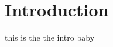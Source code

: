 \def\mytitle{KIIIB}
\def\myauthor{Andreas Møller s042809, David Emil Lemvigh s042809}
\def\affiliation{IMM@DTU}

\section{Introduction}
\label{introduction}

this is the the intro baby

